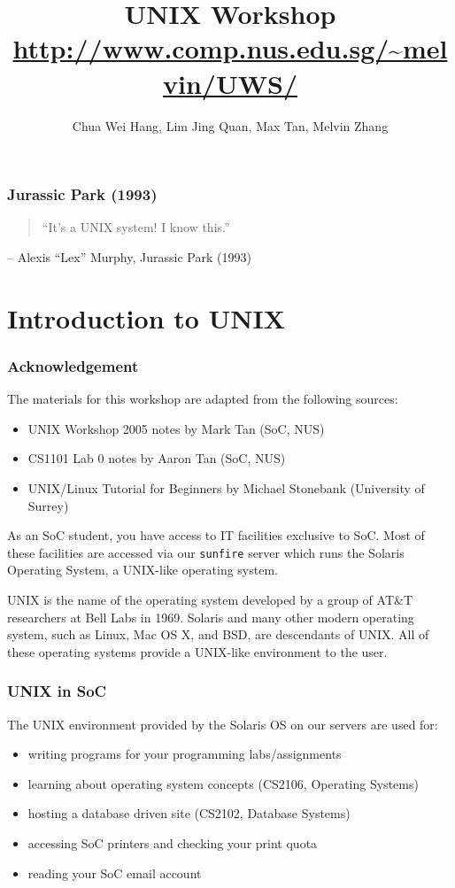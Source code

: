 \documentclass[a4paper]{beamer}
\title{UNIX Workshop\\\url{http://www.comp.nus.edu.sg/~melvin/UWS/}}
\author{Chua Wei Hang, Lim Jing Quan, Max Tan, Melvin Zhang}
\newcommand{\ftitle}[1]{\frametitle<presentation>{#1}}
\begin{document}
\maketitle



\begin{frame}
\ftitle{Jurassic Park (1993)}
\begin{quote}
``It's a UNIX system! I know this.''
\end{quote}
\begin{flushright}
-- Alexis ``Lex'' Murphy, Jurassic Park (1993)
\end{flushright}
\end{frame}


\section{Introduction to UNIX}
\begin{frame}
\ftitle{Acknowledgement}
The materials for this workshop are adapted from the following sources:
\begin{itemize}
\item UNIX Workshop 2005 notes by Mark Tan (SoC, NUS)
\item CS1101 Lab 0 notes by Aaron Tan (SoC, NUS)
\item UNIX/Linux Tutorial for Beginners by Michael Stonebank (University of Surrey)
\end{itemize}
\end{frame}


As an SoC student, you have access to IT facilities exclusive to SoC. Most of
these facilities are accessed via our \texttt{sunfire} server which runs the
Solaris Operating System, a UNIX-like operating system.  

UNIX is the name of the operating system developed by a group of AT\&T
researchers at Bell Labs in 1969.  Solaris and many other modern operating
system, such as Linux, Mac OS X, and BSD, are descendants of UNIX. All of these
operating systems provide a UNIX-like environment to the user. 

\begin{frame}
\ftitle{UNIX in SoC}
The UNIX environment provided by the Solaris OS on our servers are used for:
\begin{itemize}
\item writing programs for your programming labs/assignments
\item learning about operating system concepts (CS2106, Operating Systems)
\item hosting a database driven site (CS2102, Database Systems)
\item accessing SoC printers and checking your print quota
\item reading your SoC email account
\end{itemize}
\end{frame}
\end{document}
